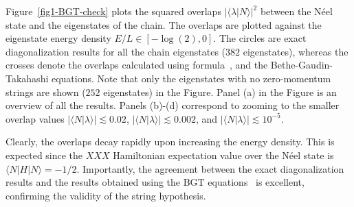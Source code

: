 \documentclass[11pt]{iopart}
\begin{document}
Figure~\ref{fig1-BGT-check} plots the squared overlaps $|\langle\lambda|
N\rangle|^2$ between the N\'eel state and the eigenstates of the chain. 
The overlaps are plotted against the eigenstate energy density $E/L
\in[-\log(2),0]$. The circles are exact diagonalization results for all 
the chain eigenstates ($382$ eigenstates), whereas the crosses denote the 
overlaps calculated using formula~, and the 
Bethe-Gaudin-Takahashi equations. Note that only the eigenstates with 
no zero-momentum strings are shown ($252$ eigenstates) in the Figure. 
Panel (a) in the Figure is an overview of all the results. Panels (b)-(d) 
correspond to zooming to the smaller overlap values $|\langle N|\lambda
\rangle|\lesssim 0.02$, $|\langle N|\lambda\rangle|\lesssim 0.002$, and 
$|\langle N|\lambda\rangle|\lesssim 10^{-5}$. 

Clearly, the overlaps decay rapidly upon increasing the energy density. 
This is expected since the $XXX$ Hamiltonian expectation value over 
the N\'eel state is $\langle N|{H}|N\rangle=-1/2$. Importantly, the 
agreement between the exact diagonalization results and the results 
obtained using the BGT equations~ is excellent, confirming 
the validity of the string hypothesis. 
\end{document}
